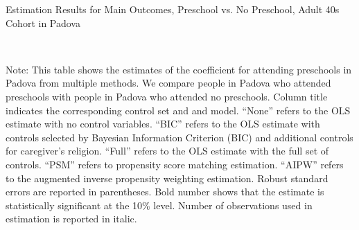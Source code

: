 \begin{table}[H] \caption{Estimation Results for Main Outcomes, Preschool vs. No Preschool, Adult 40s Cohort in Padova} \label{ols-M-adult40-reg-pres-padova}
\scalebox{0.7}{}
\vspace{1ex} \\
\footnotesize\raggedright{Note: This table shows the estimates of the coefficient for attending preschools in Padova from multiple methods. We compare people in Padova who attended preschools with people in Padova who attended no preschools. Column title indicates the corresponding control set and and model. ``None'' refers to the OLS estimate with no control variables. ``BIC'' refers to the OLS estimate with controls selected by Bayesian Information Criterion (BIC) and additional controls for caregiver's religion. ``Full'' refers to the OLS estimate with the full set of controls. ``PSM'' refers to propensity score matching estimation. ``AIPW'' refers to the augmented inverse propensity weighting estimation. Robust standard errors are reported in parentheses. Bold number shows that the estimate is statistically significant at the 10\% level. Number of observations used in estimation is reported in italic.}

\end{table}








